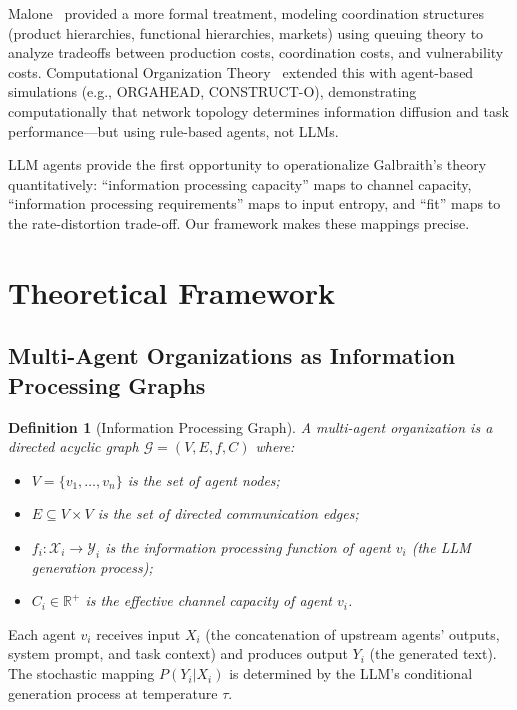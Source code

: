 \documentclass[conference]{IEEEtran}
\newtheorem{definition}{Definition}
\begin{document}
Malone~\cite{malone1987coordination} provided a more formal treatment, modeling coordination structures (product hierarchies, functional hierarchies, markets) using queuing theory to analyze tradeoffs between production costs, coordination costs, and vulnerability costs.
Computational Organization Theory~\cite{carley2002computational} extended this with agent-based simulations (e.g., ORGAHEAD, CONSTRUCT-O), demonstrating computationally that network topology determines information diffusion and task performance---but using rule-based agents, not LLMs.

LLM agents provide the first opportunity to operationalize Galbraith's theory quantitatively:
``information processing capacity'' maps to channel capacity,
``information processing requirements'' maps to input entropy,
and ``fit'' maps to the rate-distortion trade-off.
Our framework makes these mappings precise.


\section{Theoretical Framework}
\label{sec:theory}

\subsection{Multi-Agent Organizations as Information Processing Graphs}

\begin{definition}[Information Processing Graph]
A multi-agent organization is a directed acyclic graph $\mathcal{G} = (V, E, f, C)$ where:
\begin{itemize}
    \item $V = \{v_1, \ldots, v_n\}$ is the set of agent nodes;
    \item $E \subseteq V \times V$ is the set of directed communication edges;
    \item $f_i: \mathcal{X}_i \to \mathcal{Y}_i$ is the information processing function of agent $v_i$ (the LLM generation process);
    \item $C_i \in \mathbb{R}^+$ is the effective channel capacity of agent $v_i$.
\end{itemize}
\end{definition}

Each agent $v_i$ receives input $X_i$ (the concatenation of upstream agents' outputs, system prompt, and task context) and produces output $Y_i$ (the generated text).
The stochastic mapping $P(Y_i | X_i)$ is determined by the LLM's conditional generation process at temperature $\tau$.
\end{document}
